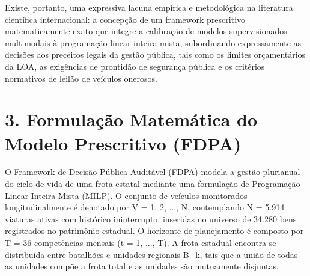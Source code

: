 \documentclass[10pt,a4paper,journal]{article}
\begin{document}
Existe, portanto, uma expressiva lacuna empírica e metodológica na literatura científica internacional: a concepção de um framework prescritivo matematicamente exato que integre a calibração de modelos supervisionados multimodais à programação linear inteira mista, subordinando expressamente as decisões aos preceitos legais da gestão pública, tais como os limites orçamentários da LOA, as exigências de prontidão de segurança pública e os critérios normativos de leilão de veículos onerosos.

\section{3. Formulação Matemática do Modelo Prescritivo (FDPA)}
O Framework de Decisão Pública Auditável (FDPA) modela a gestão plurianual do ciclo de vida de uma frota estatal mediante uma formulação de Programação Linear Inteira Mista (MILP). O conjunto de veículos monitorados longitudinalmente é denotado por V = {1, 2, ..., N}, contemplando N = 5.914 viaturas ativas com histórico ininterrupto, inseridas no universo de 34.280 bens registrados no patrimônio estadual. O horizonte de planejamento é composto por T = 36 competências mensais (t = 1, ..., T). A frota estadual encontra-se distribuída entre batalhões e unidades regionais B\_k, tais que a união de todas as unidades compõe a frota total e as unidades são mutuamente disjuntas.
\end{document}
